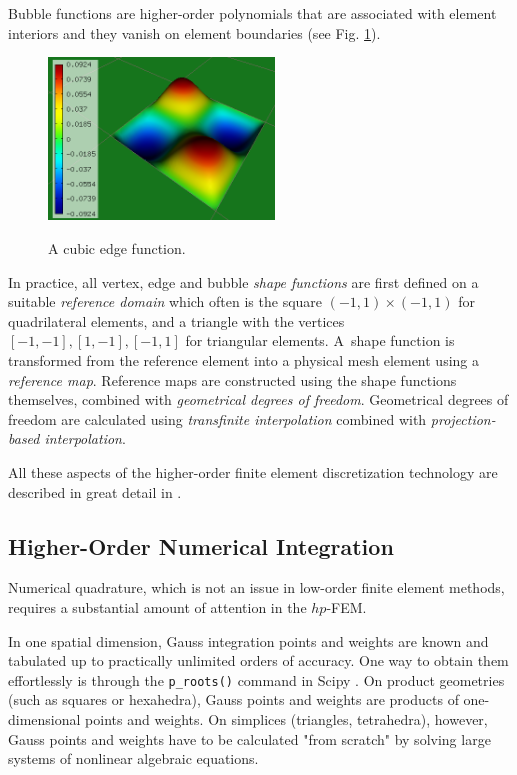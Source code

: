 \documentclass[final,3p,times,twocolumn]{elsarticle}
\begin{document}
Bubble functions are higher-order polynomials
that are associated with element interiors and 
they vanish on element boundaries (see Fig. 
\ref{fig:bubble-fn}).

\begin{figure}[!htb]
\begin{center}
 {
\includegraphics[width=6cm]{fn_bubble.png}
}
\end{center}
\caption{A cubic edge function.}
\label{fig:bubble-fn}
\end{figure}

In practice, all vertex, edge and bubble
{\em shape functions} are first defined on 
a suitable {\em reference domain} which often is 
the square $(-1, 1)\times (-1,1)$ for 
quadrilateral elements, and a triangle
with the vertices $[-1, -1], [1, -1], [-1,1]$
for triangular elements. A~shape function 
is transformed from the reference element 
into a physical mesh element using a {\em reference
map}. Reference maps are constructed using 
the shape functions themselves, combined with 
{\em geometrical degrees of freedom}. Geometrical
degrees of freedom are calculated using
{\em transfinite interpolation} combined
with {\em projection-based interpolation}.

All these aspects of the higher-order finite element 
discretization technology are described in great 
detail in \cite{sosedo}.

\subsection{Higher-Order Numerical Integration}

Numerical quadrature, which is not an issue
in low-order finite element methods, requires a substantial 
amount of attention in the $hp$-FEM.

In one spatial dimension, Gauss integration points
and weights are known and tabulated up to practically 
unlimited orders of accuracy. One way to obtain them 
effortlessly is through the {\tt p\_roots()} command
in Scipy \cite{scipy}. On product geometries (such
as squares or hexahedra), Gauss points and weights 
are products of one-dimensional points and weights.
On simplices (triangles, tetrahedra), however,
Gauss points and weights have to be calculated 
"from scratch" by solving large systems of nonlinear 
algebraic equations. 
\end{document}
